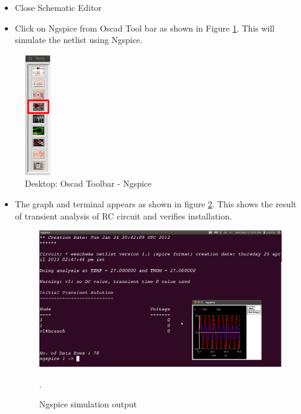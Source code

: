 \begin{itemize}
\item Close Schematic Editor
\end{itemize}
\begin{itemize}
\item Click on Ngspice from Oscad Tool bar as shown in Figure \ref{tools2}. This will simulate the netlist using Ngspice.
\end{itemize}
\begin{figure}[h]
\centering
\includegraphics[width=0.1\textwidth]{figures/tools2.png}
\caption{Desktop: Oscad Toolbar - Ngspice }
\label{tools2}
\end{figure}
\begin{itemize}
\item The graph and terminal appears as shown in figure \ref{sch}. This shows the result of transient analysis of RC circuit and verifies installation.
\begin{figure}[h]
\centering
\includegraphics[width=1.2\textwidth]{figures/output.png}
\caption{Ngspice simulation output }.
\label{sch}
\end{figure}
\end{itemize}

